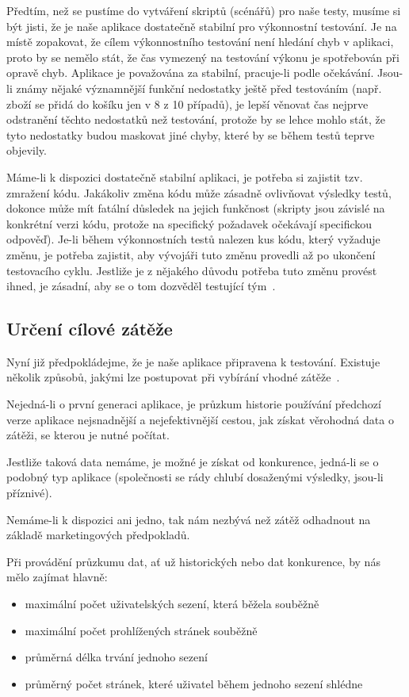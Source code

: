 \documentclass[122pt,oneside]{fithesis}
\begin{document}
Předtím, než se pustíme do vytváření skriptů (scénářů) pro naše testy, musíme si být jisti, že je naše aplikace dostatečně stabilní pro výkonnostní testování. Je na místě zopakovat, že cílem výkonnostního testování není hledání chyb v aplikaci, proto by se nemělo stát, že čas vymezený na testování výkonu je spotřebován při opravě chyb. Aplikace je považována za stabilní, pracuje-li podle očekávání. Jsou-li známy nějaké významnější funkční nedostatky ještě před testováním (např. zboží se přidá do košíku jen v 8 z 10 případů), je lepší věnovat čas nejprve odstranění těchto nedostatků než testování, protože by se lehce mohlo stát, že tyto nedostatky budou maskovat jiné chyby, které by se během testů teprve objevily.

Máme-li k dispozici dostatečně stabilní aplikaci, je potřeba si zajistit tzv. zmražení kódu. Jakákoliv změna kódu může zásadně ovlivňovat výsledky testů, dokonce může mít fatální důsledek na jejich funkčnost (skripty jsou závislé na konkrétní verzi kódu, protože na specifický požadavek očekávají specifickou odpověď). Je-li během výkonnostních testů nalezen kus kódu, který vyžaduje změnu, je potřeba zajistit, aby vývojáři tuto změnu provedli až po ukončení testovacího cyklu. Jestliže je z nějakého důvodu potřeba tuto změnu provést ihned, je zásadní, aby se o tom dozvěděl testující tým~\cite{molyneaux09}.

\subsection{Určení cílové zátěže}

Nyní již předpokládejme, že je naše aplikace připravena k testování. Existuje několik způsobů, jakými lze postupovat při vybírání vhodné zátěže~\cite{barber11}.

Nejedná-li o první generaci aplikace, je průzkum historie používání předchozí verze aplikace nejsnadnější a nejefektivnější cestou, jak získat věrohodná data o zátěži, se kterou je nutné počítat.

Jestliže taková data nemáme, je možné je získat od konkurence, jedná-li se o podobný typ aplikace (společnosti se rády chlubí dosaženými výsledky, jsou-li příznivé).

Nemáme-li k dispozici ani jedno, tak nám nezbývá než zátěž odhadnout na základě marketingových předpokladů.

Při provádění průzkumu dat, ať už historických nebo dat konkurence, by nás mělo zajímat hlavně:
\begin{itemize}
  \item maximální počet uživatelských sezení, která běžela souběžně
  \item maximální počet prohlížených stránek souběžně
  \item průměrná délka trvání jednoho sezení
  \item průměrný počet stránek, které uživatel během jednoho sezení shlédne
\end{itemize}
\end{document}

